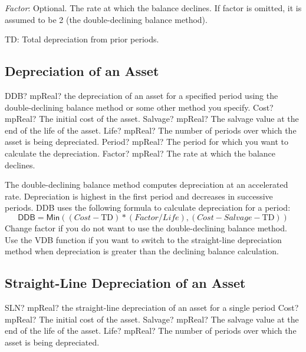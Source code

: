 \textit{Factor}: Optional. The rate at which the balance declines. If factor is omitted, it is assumed to be 2 (the double-declining balance method).

TD: Total depreciation from prior periods.



\subsection{Depreciation of an Asset}


\begin{mpFunctionsExtract}
	\mpWorksheetFunctionFiveNotImplemented
	{DDB? mpReal? the depreciation of an asset for a specified period using the double-declining balance method or some other method you specify.}
	{Cost? mpReal?  The initial cost of the asset.}
	{Salvage? mpReal? The salvage value at the end of the life of the asset.}
	{Life? mpReal? The number of periods over which the asset is being depreciated.}
	{Period? mpReal? The period for which you want to calculate the depreciation.}
	{Factor? mpReal? The rate at which the balance declines.}
\end{mpFunctionsExtract}


\vspace{0.3cm}
The double-declining balance method computes depreciation at an accelerated rate. Depreciation is highest in the first period and decreases in successive periods. DDB uses the following formula to calculate depreciation for a period: 
\begin{equation}
	\textsf{DDB} = \textsf{Min}\left((\textit{Cost} - \text{TD}) * (\textit{Factor}/\textit{Life}), (\textit{Cost}-\textit{Salvage}-\text{TD})\right)
\end{equation}
Change factor if you do not want to use the double-declining balance method.
Use the \textsf{VDB} function if you want to switch to the straight-line depreciation method when depreciation is greater than the declining balance calculation.



\subsection{Straight-Line Depreciation of an Asset}

\begin{mpFunctionsExtract}
	\mpWorksheetFunctionThreeNotImplemented
	{SLN? mpReal? the straight-line depreciation of an asset for a single period}
	{Cost? mpReal?  The initial cost of the asset.}
	{Salvage? mpReal? The salvage value at the end of the life of the asset.}
	{Life? mpReal? The number of periods over which the asset is being depreciated.}
\end{mpFunctionsExtract}

